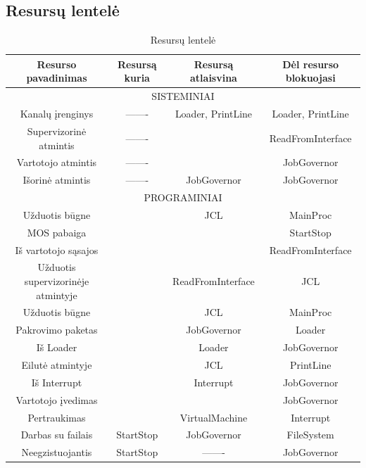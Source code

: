 \documentclass{VUMIFInfKursinis}
\begin{document}
\subsection{Resursų lentelė}

\begin{table}[H]\footnotesize
	\centering
	\caption{Resursų lentelė}    %
	\begin{tabular}{|c|c|c|c|}
		\hline
		Resurso pavadinimas & Resursą kuria & Resursą atlaisvina & Dėl resurso blokuojasi \\
		\hline
		\multicolumn{4}{c}{SISTEMINIAI}\\
		\hline
		Kanalų įrenginys & ------- & Loader, PrintLine & Loader, PrintLine\\
		\hline
		Supervizorinė atmintis & ------- & & ReadFromInterface \\
		\hline
		Vartotojo atmintis & ------- & & JobGovernor\\
		\hline
		Išorinė atmintis & ------- & JobGovernor & JobGovernor \\
		\hline
		\multicolumn{4}{c}{PROGRAMINIAI}\\
		\hline
		Užduotis būgne & & JCL & MainProc \\
		\hline
		MOS pabaiga & & & StartStop \\
		\hline
		Iš vartotojo sąsajos &  & & ReadFromInterface \\
		\hline
		Užduotis supervizorinėje atmintyje & & ReadFromInterface & JCL \\
		\hline
		Užduotis būgne & & JCL & MainProc \\
		\hline
		Pakrovimo paketas & & JobGovernor & Loader \\
		\hline
		Iš Loader & & Loader & JobGovernor \\
		\hline
		Eilutė atmintyje & & JCL & PrintLine\\
		\hline
		Iš Interrupt & & Interrupt & JobGovernor\\
		\hline
		Vartotojo įvedimas & & & JobGovernor \\
		\hline 
		Pertraukimas & & VirtualMachine & Interrupt\\
		\hline 
		Darbas su failais & StartStop & JobGovernor & FileSystem \\
		\hline
		Neegzistuojantis & StartStop & ------- & JobGovernor \\
		\hline
	\end{tabular}
	\label{tab:resursu_lentele}
\end{table}

\printbibliography[heading=bibintoc] %
\appendix  %
\end{document}
